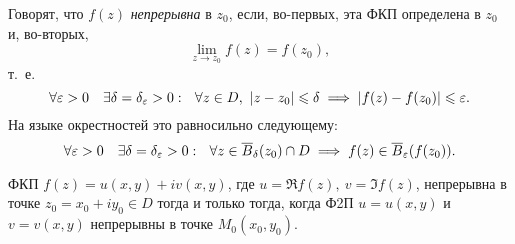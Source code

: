 \documentclass[../../main.tex]{subfiles}
\begin{document}
Говорят, что $f(z)$ \emph{непрерывна} в $z_0$,
если, во-первых, эта ФКП определена в $z_0$ и,
во-вторых,
\begin{equation}
\label{lec28:2}
\lim\limits_{z \to z_0} f(z)= f(z_0),
\end{equation}
т.~е.
\[
\forall \varepsilon > 0 \quad \exists \delta = \delta_{\varepsilon} > 0 : \ \
\forall z \in D ,\ \left|{z - z_0}\right| \leqslant \delta
\implies \left|{f(z) - f(z_0)}\right| \leqslant \varepsilon.
\]
На языке окрестностей это равносильно следующему:
\[
\forall \varepsilon > 0 \quad \exists \delta = \delta_{\varepsilon} > 0 : \ \
\forall z \in \overline{B}_{\delta} (z_0) \cap D
\implies f(z) \in \overline{B}_{\varepsilon} (f(z_0)).
\]
\begin{thm}
	ФКП $f(z) = u(x, y) + i v(x, y)$, где $u = \Re f(z),\ v = \Im f(z)$,
	непрерывна в точке $z_0 = x_0 + i y_0 \in D$
	тогда и только тогда, когда
	Ф2П $u = u(x, y)$ и $v = v(x, y)$ непрерывны в точке $M_0(x_0, y_0)$.
\end{thm}
\end{document}
